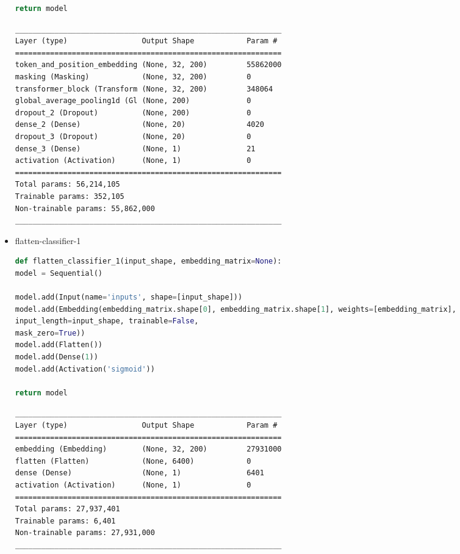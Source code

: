 \documentclass{article}
\begin{document}
\begin{itemize}
\begin{lstlisting}[language=Python, caption=Дефиниция на transformer-classifier-5.]
return model
\end{lstlisting}

\begin{lstlisting}[numbers=none, caption=Обобщение на transformer-classifier-5.]
_____________________________________________________________
Layer (type)                 Output Shape            Param #
=============================================================
token_and_position_embedding (None, 32, 200)         55862000
masking (Masking)            (None, 32, 200)         0
transformer_block (Transform (None, 32, 200)         348064
global_average_pooling1d (Gl (None, 200)             0
dropout_2 (Dropout)          (None, 200)             0
dense_2 (Dense)              (None, 20)              4020
dropout_3 (Dropout)          (None, 20)              0
dense_3 (Dense)              (None, 1)               21
activation (Activation)      (None, 1)               0
=============================================================
Total params: 56,214,105
Trainable params: 352,105
Non-trainable params: 55,862,000
_____________________________________________________________
\end{lstlisting}

\item flatten-classifier-1

\begin{lstlisting}[language=Python, caption=Дефиниция на flatten-classifier-1.]
def flatten_classifier_1(input_shape, embedding_matrix=None):
model = Sequential()

model.add(Input(name='inputs', shape=[input_shape]))
model.add(Embedding(embedding_matrix.shape[0], embedding_matrix.shape[1], weights=[embedding_matrix],
input_length=input_shape, trainable=False,
mask_zero=True))
model.add(Flatten())
model.add(Dense(1))
model.add(Activation('sigmoid'))

return model
\end{lstlisting}

\begin{lstlisting}[numbers=none, caption=Обобщение на flatten-classifier-1.]
_____________________________________________________________
Layer (type)                 Output Shape            Param #
=============================================================
embedding (Embedding)        (None, 32, 200)         27931000
flatten (Flatten)            (None, 6400)            0
dense (Dense)                (None, 1)               6401
activation (Activation)      (None, 1)               0
=============================================================
Total params: 27,937,401
Trainable params: 6,401
Non-trainable params: 27,931,000
_____________________________________________________________
\end{lstlisting}


\end{itemize}
\end{document}
